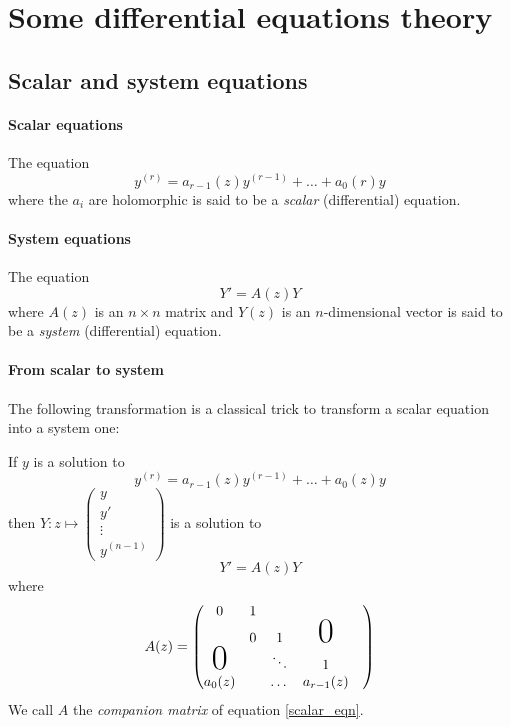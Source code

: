 \documentclass[../main.tex]{subfiles}
\begin{document}
\section{Some differential equations theory}

\subsection{Scalar and system equations}

\paragraph{Scalar equations}

The equation
\begin{equation}\label{scalar_eq}
	y^{(r)} = a_{r - 1}(z) y^{(r - 1)} + \dots + a_0(r) y
\end{equation}
where the $a_i$ are holomorphic is said to be a \emph{scalar} (differential) equation.

\paragraph{System equations}

The equation
\begin{equation}\label{system_eq}
	Y' = A(z) Y
\end{equation}
where $A(z)$ is an $n \times n$ matrix and $Y(z)$ is an $n$-dimensional vector
is said to be a \emph{system} (differential) equation.

\paragraph{From scalar to system}

The following transformation is a classical trick to transform a scalar equation into a system one:

If $y$ is a solution to 
\begin{equation*}\label{scalar_eqn}
	y^{(r)} = a_{r - 1}(z) y^{(r - 1)} + \dots + a_0(z) y
\end{equation*}
then
$Y : z \mapsto \begin{pmatrix}
y\\
y'\\
\vdots \\
y^{(n - 1)}
\end{pmatrix}$
is a solution to
\begin{equation*}
	Y' = A(z)Y
\end{equation*} where
\begin{equation*}
A(z)=
\begin{pmatrix}
0&1&&&\\
 &0&1&\mbox{\Huge 0}\\
 \mbox{\Huge 0}& &\ddots & 1\\
a_0(z) & & \dots & a_{r - 1}(z)
\end{pmatrix}
\end{equation*}
We call $A$ the \emph{companion matrix} of equation \eqref{scalar_eqn}.
\end{document}
